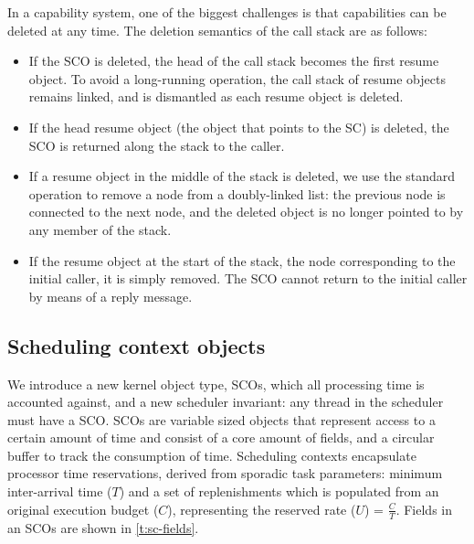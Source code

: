In a capability system, one of the biggest challenges is that capabilities can be deleted at any
time. The deletion semantics of the call stack are as follows: 
\begin{itemize}
    \item If the \gls{SCO} is deleted, the head of the call stack becomes the first resume object. To avoid
        a long-running operation, the call stack of resume objects remains linked, and is dismantled
        as each resume object is deleted.
    \item If the head resume object (the object that points to the SC) is deleted, the \gls{SCO} is
        returned along the stack to the caller. 
    \item If a resume object in the middle of the stack is deleted, we use the standard operation to
        remove a node from a doubly-linked list: the previous node is connected to the next node,
        and the deleted object is no longer pointed to by any member of the stack.
    \item If the resume object at the start of the stack, the node corresponding to the initial
        caller, it is simply removed. The \gls{SCO} cannot return to the initial caller by means of a reply
        message.
\end{itemize}
    
\subsection{Scheduling context objects}
\label{s:sco}

We introduce a new kernel object type, \glspl{SCO}, which all processing time is accounted against, 
and a new scheduler invariant: any thread in the scheduler must have a \gls{SCO}. 
\glspl{SCO} are variable sized objects that represent access to a certain amount of time and
consist of a core amount of fields, and a circular buffer to track the consumption of time.
Scheduling contexts encapsulate processor time reservations,
derived from sporadic task parameters: minimum inter-arrival time ($T$) and a set of replenishments which is
populated from an original execution budget ($C$), representing the reserved rate
($U$) = $\frac{C}{T}$.
Fields in an \glspl{SCO} are shown in \cref{t:sc-fields}.

